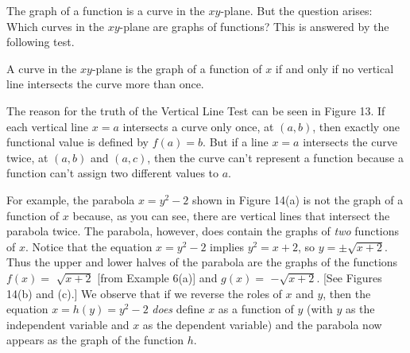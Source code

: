 \documentclass{sebase}
\begin{document}
The graph of a function is a curve in the $xy$-plane. But the question
arises: Which curves in the $xy$-plane are graphs of functions? This is
answered by the following test.

\STARTBOX%

\quad A curve in the $xy$-plane is the
graph of a function of $x$ if and only if no vertical line intersects the
curve more than once.

\ENDBOX%

The reason for the truth of the Vertical Line Test can be seen in Figure 13.
If each vertical line $x=a$ intersects a curve only once, at $(a,b)$, then
exactly one functional value is defined by $f(a)=b$. But if a line $x=a$
intersects the curve twice, at $(a,b)$ and $(a,c)$, then the curve can't
represent a function because a function can't assign two different values to 
$a$.\\[6pt]
\hspace*{\fill}\hspace*{\fill}\vspace*{8pt%
}

For example, the parabola $x=y^{2}-2$ shown in Figure 14(a) is not the graph
of a function of $x$ because, as you can see, there are vertical lines that
intersect the parabola twice. The parabola, however, does contain the graphs
of \textit{two} functions of $x$. Notice that the equation $x=y^{2}-2$
implies $y^{2}=x+2$, so $y=\pm \sqrt{x+2}$. Thus the upper and lower halves
of the parabola are the graphs of the functions $f(x)=$ $\sqrt{x+2}$ [from
Example 6(a)] and $g(x)=$ $-\sqrt{x+2}$. [See Figures 14(b) and (c).] We
observe that if we reverse the roles of $x$ and $y$, then the equation $%
x=h(y)=y^{2}-2$ \textit{does} define $x$ as a function of $y$ (with $y$ as
the independent variable and $x$ as the dependent variable) and the parabola
now appears as the graph of the function $h$.

\vspace{12pt}\hskip-40pt\hfil%
%
\vspace{12pt}\hfil%
\end{document}
